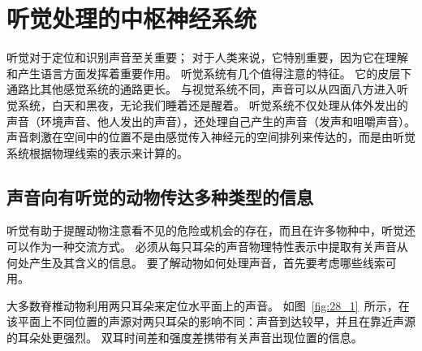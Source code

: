 \chapter{听觉处理的中枢神经系统} \label{chap:chap28}

听觉对于定位和识别声音至关重要；
对于人类来说，它特别重要，因为它在理解和产生语言方面发挥着重要作用。
听觉系统有几个值得注意的特征。
它的皮层下通路比其他感觉系统的通路更长。
与视觉系统不同，声音可以从四面八方进入听觉系统，白天和黑夜，无论我们睡着还是醒着。
听觉系统不仅处理从体外发出的声音（环境声音、他人发出的声音），还处理自己产生的声音（发声和咀嚼声音）。
声音刺激在空间中的位置不是由感觉传入神经元的空间排列来传达的，而是由听觉系统根据物理线索的表示来计算的。



\section{声音向有听觉的动物传达多种类型的信息}


听觉有助于提醒动物注意看不见的危险或机会的存在，而且在许多物种中，听觉还可以作为一种交流方式。
必须从每只耳朵的声音物理特性表示中提取有关声音从何处产生及其含义的信息。
要了解动物如何处理声音，首先要考虑哪些线索可用。


大多数脊椎动物利用两只耳朵来定位水平面上的声音。
如图~\ref{fig:28_1}~所示，在该平面上不同位置的声源对两只耳朵的影响不同：声音到达较早，并且在靠近声源的耳朵处更强烈。
双耳时间差和强度差携带有关声音出现位置的信息。



